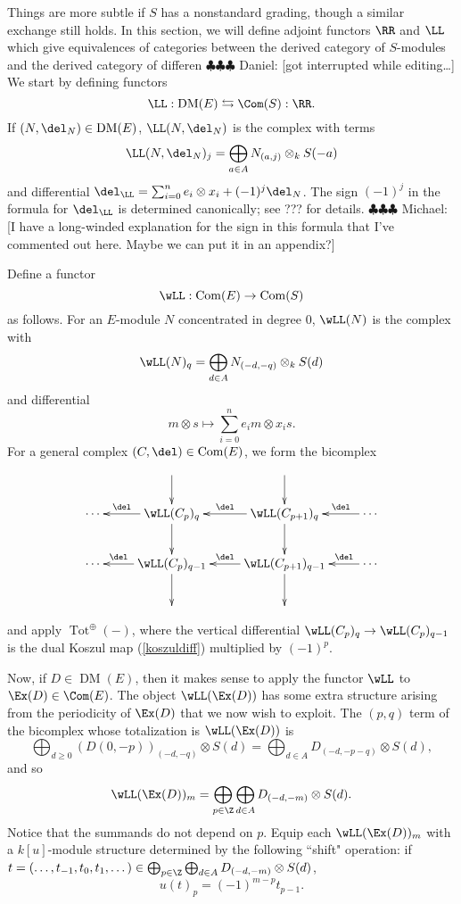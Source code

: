 \documentclass[12pt]{amsart}
\theoremstyle{definition}
\theoremstyle{remark}
\newcommand{\daniel}[1]{{\color{blue} \sf $\clubsuit\clubsuit\clubsuit$ Daniel: [#1]}}
\newcommand{\michael}[1]{{\color{red} \sf $\clubsuit\clubsuit\clubsuit$ Michael: [#1]}}
\def\on{\operatorname}
\def\DM{\operatorname{DM}}
\begin{document}
Things are more subtle if $S$ has a nonstandard grading, though a similar exchange still holds.  In this section, we will define adjoint functors $\RR$ and $\LL$ which give equivalences of categories between the derived category of $S$-modules and the derived category of differen \daniel{got interrupted while editing\dots}
\fi
We start by defining functors
$$
\LL : \DM(E) \leftrightarrows \Com(S) : \RR.
$$
If $(N, \del_N) \in \DM(E)$, $\LL(N, \del_N)$ is the complex with terms
$$
\LL(N, \del_N)_j = \bigoplus_{a \in A} N_{(a, j)} \otimes_k S(-a)
$$
and differential $\del_{\LL} = \sum_{i = 0}^n e_i \otimes x_i + (-1)^j \del_N$. The sign $(-1)^j$ in the formula for $\del_{\LL}$ is determined canonically; see ??? for details. \michael{I have a long-winded explanation for the sign in this formula that I've commented out here. Maybe we can put it in an appendix?}


\iffalse
Define a functor
$$
\wLL : \on{Com}(E) \to \on{Com}(S)
$$
as follows. For an $E$-module $N$ concentrated in degree 0, $\wLL(N)$ is the complex with
$$
\wLL(N)_q = \bigoplus_{d \in A} N_{(-d, -q)} \otimes_k S(d)
$$ 
and differential
\begin{equation}
\label{koszuldiff}
m \otimes s \mapsto \sum_{i = 0}^n e_im \otimes x_is.
\end{equation}
For a general complex $(C, \del) \in \on{Com}(E)$, we form the bicomplex
\begin{equation}
\label{bicomplex}
\xymatrix{ 
& \ar[d] & \ar[d]  & \\
\cdots & \wLL(C_{p})_{q}\ar[l]_-{ \del}  \ar[d]     & \wLL(C_{p + 1})_q   \ar[d] \ar[l]_-{ \del} & \cdots \ar[l]_-{\del} \\
\cdots & \wLL(C_{p })_{q- 1} \ar[d] \ar[l]_-{\del} &  \wLL(C_{p+1})_{q-1} \ar[d] \ar[l]_-{\del} & \ar[l]_-{\del}  \cdots \\
&&&
}
\end{equation}
and apply $\on{Tot}^{\oplus}( - )$, where the vertical differential $ \wLL(C_{p})_{q} \to  \wLL(C_{p})_{q-1}$ is the dual Koszul map (\ref{koszuldiff}) multiplied by $(-1)^p$. 

Now, if $D \in \DM(E)$, then it makes sense to apply the functor $\wLL$ to $\Ex(D) \in \Com(E)$. The object $\wLL(\Ex(D))$ has some extra structure arising from the periodicity of $\Ex(D)$ that we now wish to exploit. The $(p,q)$ term of the bicomplex whose totalization is $\wLL(\Ex(D))$ is 
$$
\bigoplus_{d \ge 0} (D(0, -p))_{(-d, -q)} \otimes S(d) = \bigoplus_{d \in A} D_{(-d, -p-q)} \otimes S(d),
$$
and so
$$
\wLL(\Ex(D))_m = \bigoplus_{p \in \Z}  \bigoplus_{d \in A} D_{(-d, -m)} \otimes S(d).
$$
Notice that the summands do not depend on $p$. Equip each $\wLL(\Ex(D))_m$ with a $k[u]$-module structure determined by the following ``shift" operation: if $t = (\dots, t_{-1}, t_0, t_1, \dots) \in \bigoplus_{p \in \Z}  \bigoplus_{d \in A} D_{(-d, -m)} \otimes S(d)$,
$$
u(t)_p = (-1)^{m - p} t_{p - 1}. 
$$
\end{document}
